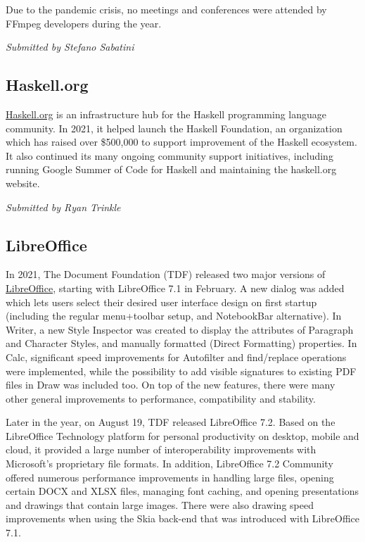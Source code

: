 \documentclass[a4paper]{report}
\begin{document}
Due to the pandemic crisis, no meetings and conferences were attended by FFmpeg developers during the year.

{\em Submitted by Stefano Sabatini}

\subsection{Haskell.org}

\href{https://www.haskell.org/}{Haskell.org} is an infrastructure hub for the Haskell programming language community. In 2021, it helped launch the Haskell Foundation, an organization which has raised over \$500,000 to support improvement of the Haskell ecosystem. It also continued its many ongoing community support initiatives, including running Google Summer of Code for Haskell and maintaining the haskell.org website.

{\em Submitted by Ryan Trinkle}

\subsection{LibreOffice}

In 2021, The Document Foundation (TDF) released two major versions of \href{https://www.libreoffice.org/}{LibreOffice}, starting with LibreOffice 7.1 in February. A new dialog was added which lets users select their desired user interface design on first startup (including the regular menu+toolbar setup, and NotebookBar alternative). In Writer, a new Style Inspector was created to display the attributes of Paragraph and Character Styles, and manually formatted (Direct Formatting) properties. In Calc, significant speed improvements for Autofilter and find/replace operations were implemented, while the possibility to add visible signatures to existing PDF files in Draw was included too. On top of the new features, there were many other general improvements to performance, compatibility and stability.

Later in the year, on August 19, TDF released LibreOffice 7.2. Based on the LibreOffice Technology platform for personal productivity on desktop, mobile and cloud, it provided a large number of interoperability improvements with Microsoft's proprietary file formats. In addition, LibreOffice 7.2 Community offered numerous performance improvements in handling large files, opening certain DOCX and XLSX files, managing font caching, and opening presentations and drawings that contain large images. There were also drawing speed improvements when using the Skia back-end that was introduced with LibreOffice 7.1.
\end{document}
